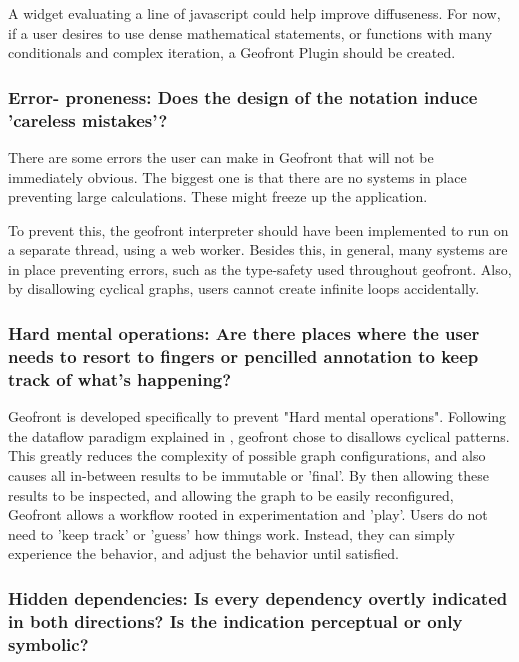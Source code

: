 A widget evaluating a line of javascript could help improve diffuseness. For now, if a user desires to use dense mathematical statements, or functions with many conditionals and complex iteration, a Geofront Plugin should be created.



\subsubsection*{Error- proneness: Does the design of the notation induce 'careless mistakes'?}

There are some errors the user can make  in Geofront that will not be immediately obvious. 
The biggest one is that there are no systems in place preventing large calculations. 
These might freeze up the application. 

To prevent this, the geofront interpreter should have been implemented to run on a separate thread, using a web worker. 
Besides this, in general, many systems are in place preventing errors, such as the type-safety used throughout geofront.
Also, by disallowing cyclical graphs, users cannot create infinite loops accidentally.

\subsubsection*{Hard mental operations: Are there places where the user needs to resort to fingers or pencilled annotation to keep track of what's happening?}

Geofront is developed specifically to prevent "Hard mental operations".
Following the dataflow paradigm explained in , geofront chose to disallows cyclical patterns. 
This greatly reduces the complexity of possible graph configurations, and also causes all in-between results to be immutable or 'final'.
By then allowing these results to be inspected, and allowing the graph to be easily reconfigured, Geofront allows a workflow rooted in experimentation and 'play'.
Users do not need to 'keep track' or 'guess' how things work.
Instead, they can simply experience the behavior, and adjust the behavior until satisfied. 



\subsubsection*{Hidden dependencies: Is every dependency overtly indicated in both directions? Is the indication perceptual or only symbolic?}

